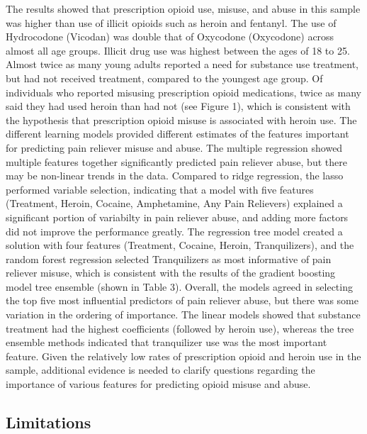 \documentclass[sigconf]{acmart}
\begin{document}
The results showed that prescription opioid use, misuse, and abuse in this 
sample was higher than use of illicit opioids such as heroin and fentanyl. 
The use of Hydrocodone (Vicodan) was double that of Oxycodone (Oxycodone) 
across almost all age groups. Illicit drug use was highest between the ages 
of 18 to 25. Almost twice as many young adults reported a need for substance 
use treatment, but had not received treatment, compared to the youngest age 
group. Of individuals who reported misusing prescription opioid medications, 
twice as many said they had used heroin than had not (see Figure 1), which is 
consistent with the hypothesis that prescription opioid misuse is associated 
with heroin use. The different learning models provided different estimates 
of the features important for predicting pain reliever misuse and abuse. 
The multiple regression showed multiple features together significantly 
predicted pain reliever abuse, but there may be non-linear trends in the data.
Compared to ridge regression, the lasso performed variable selection, 
indicating that a model with five features (Treatment, Heroin, Cocaine, 
Amphetamine, Any Pain Relievers) explained a significant portion of
variabilty in pain reliever abuse, and adding more factors did not improve
the performance greatly. The regression tree model created a solution
with four features (Treatment, Cocaine, Heroin, Tranquilizers), and the
random forest regression selected Tranquilizers as most informative of
pain reliever misuse, which is consistent with the results of the gradient
boosting model tree ensemble (shown in Table 3). Overall, the models 
agreed in selecting the top five most influential predictors of pain
reliever abuse, but there was some variation in the ordering of importance. 
The linear models showed that substance treatment had the highest
coefficients (followed by heroin use), whereas the tree ensemble methods
indicated that tranquilizer use was the most important feature. Given the 
relatively low rates of prescription opioid and heroin use in the sample, 
additional evidence is needed to clarify questions regarding the importance
of various features for predicting opioid misuse and abuse. 
 



\subsection{Limitations}
\end{document}

